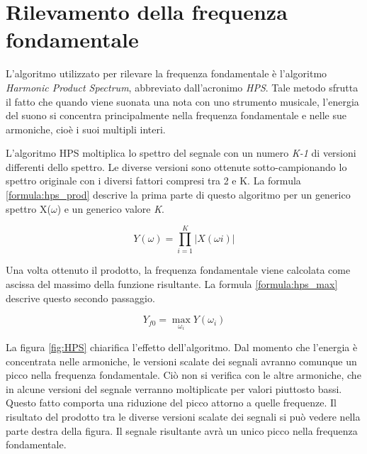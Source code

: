\chapter{Rilevamento della frequenza fondamentale}\label{cap:rilevamento_frequenza}

L'algoritmo utilizzato per rilevare la frequenza fondamentale è l'algoritmo \emph{Harmonic Product Spectrum}, abbreviato dall'acronimo \emph{HPS}.
Tale metodo sfrutta il fatto che quando viene suonata una nota con uno strumento musicale, l'energia del suono si concentra principalmente nella frequenza fondamentale e nelle sue armoniche, cioè i suoi multipli interi.

L'algoritmo HPS moltiplica lo spettro del segnale con un numero \emph{K-1} di versioni differenti dello spettro.
Le diverse versioni sono ottenute sotto-campionando lo spettro originale con i diversi fattori compresi tra 2 e K.
La formula \ref{formula:hps_prod} descrive la prima parte di questo algoritmo per un generico spettro X($\omega$) e un generico valore \emph{K}.

	\begin{equation}\label{formula:hps_prod}
		Y(\omega) = \prod_{i=1}^K \left | X(\omega i) \right |
	\end{equation}

Una volta ottenuto il prodotto, la frequenza fondamentale viene calcolata come ascissa del massimo della funzione risultante. 
La formula \ref{formula:hps_max} descrive questo secondo passaggio.

	\begin{equation}\label{formula:hps_max}
		Y_{f0} = \max_{\omega_i} Y \left(\omega_i \right )
	\end{equation}

La figura \ref{fig:HPS} chiarifica l'effetto dell'algoritmo. 
Dal momento che l'energia è concentrata nelle armoniche, le versioni scalate dei segnali avranno comunque un picco nella frequenza fondamentale. 
Ciò non si verifica con le altre armoniche, che in alcune versioni del segnale verranno moltiplicate per valori piuttosto bassi. 
Questo fatto comporta una riduzione del picco attorno a quelle frequenze. 
Il risultato del prodotto tra le diverse versioni scalate dei segnali si può vedere nella parte destra della figura. 
Il segnale risultante avrà un unico picco nella frequenza fondamentale.

